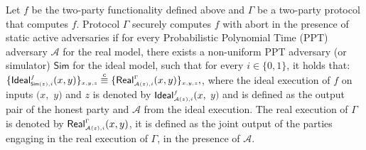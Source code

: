  \vspace{-2.5mm} 
  
  
\begin{definition}\label{def::MPC-active-adv}
Let $f$ be the two-party functionality defined above and $\Gamma$ be a two-party protocol that computes $f$.   Protocol $\Gamma$ securely computes $f$ with abort in the presence of static active adversaries if for every Probabilistic Polynomial Time (PPT) adversary $\mathcal{A}$ for the real model, there exists a non-uniform PPT adversary (or simulator) $\mathsf{Sim}$ for the ideal model, such that for every $i\in \{0,1\}$, it holds that: 
%
$
\{\mathsf {Ideal}^{\scriptscriptstyle f}_{\scriptscriptstyle \mathsf{Sim}(z), i}(x,y)\}_{\scriptscriptstyle x,y,z}\stackrel{c}{\equiv} \{\mathsf{Real}_{\scriptscriptstyle \mathcal{A}(z), i}^{\scriptscriptstyle \Gamma}(x,y) \}_{\scriptscriptstyle x,y,z},
$, 
%
 where the ideal execution of $f$ on inputs $(x,$ $ y)$ and $z$ is denoted by $\mathsf{Ideal}^{\scriptscriptstyle f}_{\scriptscriptstyle\mathcal{A}(z), i}(x,$ $y)$ and is defined as the output pair of the honest party and $\mathcal{A}$ from the ideal execution. The real execution of $\Gamma$ is denoted by $\mathsf{Real}^{\scriptscriptstyle \Gamma}_{\scriptscriptstyle\mathcal{A}(z), i}(x,y)$, it is defined as the joint output of the parties engaging in the real execution of $\Gamma$, in the presence of $\mathcal{A}$. 
 \vspace{-3mm}
 \end{definition}

  